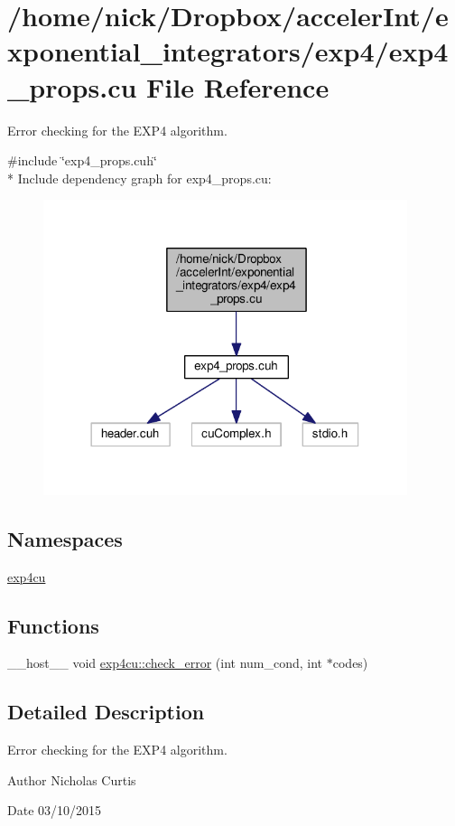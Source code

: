 \hypertarget{exp4__props_8cu}{}\section{/home/nick/\+Dropbox/acceler\+Int/exponential\+\_\+integrators/exp4/exp4\+\_\+props.cu File Reference}
\label{exp4__props_8cu}


Error checking for the E\+X\+P4 algorithm.  


{\ttfamily \#include \char`\"{}exp4\+\_\+props.\+cuh\char`\"{}}\\*
Include dependency graph for exp4\+\_\+props.\+cu\+:
\nopagebreak
\begin{figure}[H]
\begin{center}
\leavevmode
\includegraphics[width=302pt]{exp4__props_8cu__incl}
\end{center}
\end{figure}
\subsection*{Namespaces}
\begin{DoxyCompactItemize}
\item 
 \hyperlink{namespaceexp4cu}{exp4cu}
\end{DoxyCompactItemize}
\subsection*{Functions}
\begin{DoxyCompactItemize}
\item 
\+\_\+\+\_\+host\+\_\+\+\_\+ void \hyperlink{namespaceexp4cu_a2d5234f5e9971aec336ac64ce719f1f4}{exp4cu\+::check\+\_\+error} (int num\+\_\+cond, int $\ast$codes)
\end{DoxyCompactItemize}


\subsection{Detailed Description}
Error checking for the E\+X\+P4 algorithm. 

\begin{DoxyAuthor}{Author}
Nicholas Curtis 
\end{DoxyAuthor}
\begin{DoxyDate}{Date}
03/10/2015 
\end{DoxyDate}
